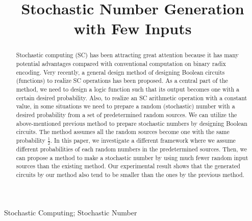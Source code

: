 \documentclass[10pt,conference]{IEEEtran}
\begin{document}
\title{Stochastic Number Generation with Few Inputs
\bigskip}
\bigskip

\author{
}

\maketitle

\begin{abstract}
Stochastic computing (SC) has been attracting great
attention because it has many potential advantages compared
with conventional computation on binary radix encoding. Very
recently, a general design method of designing Boolean circuits
(functions) to realize SC operations has been proposed. As a
central part of the method, we need to design a logic function such
that its output becomes one with a certain desired probability.
Also, to realize an SC arithmetic operation with a constant value,
in some situations we need to prepare a random (stochastic)
number with a desired probability from a set of predetermined
random sources. We can utilize the above-mentioned previous
method to prepare stochastic numbers by designing Boolean
circuits. The method assumes all the random sources become
one with the same probability $\frac{1}{2}$. In this paper, we investigate
a different framework where we assume different probabilities
of each random numbers in the predetermined sources. Then,
we can propose a method to make a stochastic number by using
much fewer random input sources than the existing method.
Our experimental result shows that the generated circuits by our
method also tend to be smaller than the ones by the previous
method.

\end{abstract}
\begin{IEEEkeywords} 
Stochastic Computing; Stochastic Number
\end{IEEEkeywords}
\end{document}
